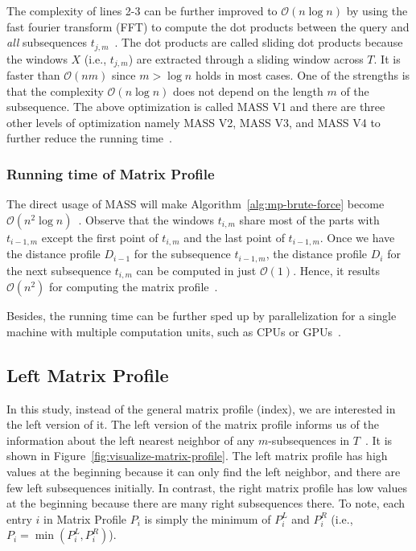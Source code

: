 The complexity of lines 2-3 can be further improved to $\mathcal{O}(n \log n)$ by using the fast fourier transform (FFT) to compute the dot products between the query and \textit{all} subsequences $t_{j, m}$~\cite{zhong2024mass}.
The dot products are called sliding dot products because the windows $X$ (i.e., $t_{j, m}$) are extracted through a sliding window across $T$.
It is faster than $\mathcal{O}(nm)$ since $m > \log n$ holds in most cases.
One of the strengths is that the complexity $\mathcal{O}(n \log n)$ does not depend on the length $m$ of the subsequence.
The above optimization is called MASS V1 and there are three other levels of optimization namely MASS V2, MASS V3, and MASS V4 to further reduce the running time~\cite{zhong2024mass}.

\subsubsection{Running time of Matrix Profile}
The direct usage of MASS will make Algorithm~\ref{alg:mp-brute-force} become $\mathcal{O}(n^2 \log n)$~\cite{yeh2016matrix}.
Observe that the windows $t_{i,m}$ share most of the parts with $t_{i-1,m}$ except the first point of $t_{i,m}$ and the last point of $t_{i-1,m}$. 
Once we have the distance profile $D_{i-1}$ for the subsequence $t_{i-1,m}$, the distance profile $D_i$ for the next subsequence $t_{i,m}$ can be computed in just $\mathcal{O}(1)$.
Hence, it results $\mathcal{O}(n^2)$ for computing the matrix profile~\cite{zhu2016matrix}.

Besides, the running time can be further sped up by parallelization for a single machine with multiple computation units, such as CPUs or GPUs~\cite{zhu2016matrix}.

\subsection{Left Matrix Profile} %

In this study, instead of the general matrix profile (index), we are interested in the left version of it.
The left version of the matrix profile informs us of the information about the left nearest neighbor of any $m$-subsequences in $T$~\cite{zhu2017matrix}.
It is shown in Figure~\ref{fig:visualize-matrix-profile}.
The left matrix profile has high values at the beginning because it can only find the left neighbor, and there are few left subsequences initially.
In contrast, the right matrix profile has low values at the beginning because there are many right subsequences there.
To note, each entry $i$ in Matrix Profile $P_i$ is simply the minimum of $P_i^L$ and $P_i^R$ (i.e., $P_i = \min(P_i^L, P_i^R)$).

